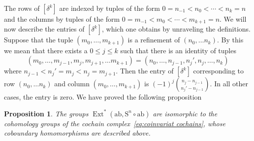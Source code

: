 \documentclass[psamsfonts]{amsart}
\theoremstyle{plain}
\newtheorem{prop}[thm]{Proposition}
\theoremstyle{definition}
\theoremstyle{remark}
\newcommand{\abelianization}{\mathrm{ab}}
\newcommand{\symm}{\mathrm{S}}
\DeclareMathOperator{\ext}{Ext}
\begin{document}
The rows of $[\delta^k]$ are indexed by tuples of the form $0=n_{-1}< n_0<\cdots <n_k=n$ and the columns by tuples of the form $0=m_{-1}< m_0<\cdots <m_{k+1}=n$.
We will now describe the entries of $[\delta^k]$, which one obtains by unraveling the definitions. Suppose that the tuple $(m_0, \ldots, m_{k+1})$ is a refinement of $(n_0, \ldots n_k)$. By this we mean that there exists a $0\le j\le k$ such that there is an identity of tuples
\[(m_0, \ldots,m_{j-1}, m_{j}, m_{j+1}, \ldots m_{k+1})=(n_0, \ldots,  n_{j-1},n_j', n_{j}, \ldots, n_k)\]
where $n_{j-1}<n_j'=m_{j}< n_{j}=m_{j+1}$. Then the entry of $[\delta^k]$ corresponding to row $(n_0, \ldots n_k)$ and column $(m_0, \ldots, m_{k+1})$ is $(-1)^j {n_{j}-n_{j-1} \choose n_j'-n_{j-1}}$. In all other cases, the entry is zero.
We have proved the following proposition
\begin{prop}
The groups $\ext^*(\abelianization,\symm^n\circ\abelianization)$ are isomorphic to the cohomology groups of the cochain complex~\eqref{eq:coinvariat cochains}, whose coboundary homomorphisms are described above.
\end{prop}
\end{document}
